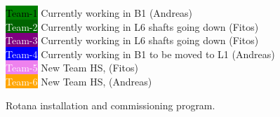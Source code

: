 \begin{fullwidth}
\begin{figure*}[htbp]
\colorbox{green}{\textcolor{black}{Team-1}} Currently working in B1 (Andreas)\\[3pt]
\colorbox{DarkGreen}{\textcolor{white}{Team-2}} Currently working in L6 shafts going down (Fitos)\\[3pt]
\colorbox{purple}{\textcolor{white}{Team-3}} Currently working in L6 shafts going down (Fitos)\\[3pt]
\colorbox{blue}{\textcolor{white}{Team-4}} Currently working in B1 to be moved to L1 (Andreas)\\[3pt]
\colorbox{violet}{\textcolor{white}{Team-5}} New Team HS, (Fitos)\\[3pt]
\colorbox{orange}{\textcolor{white}{Team-6}} New Team HS, (Andreas)\\[3pt]
\caption{Rotana installation and commissioning program.}
\label{plan}
\end{figure*}

\end{fullwidth}



